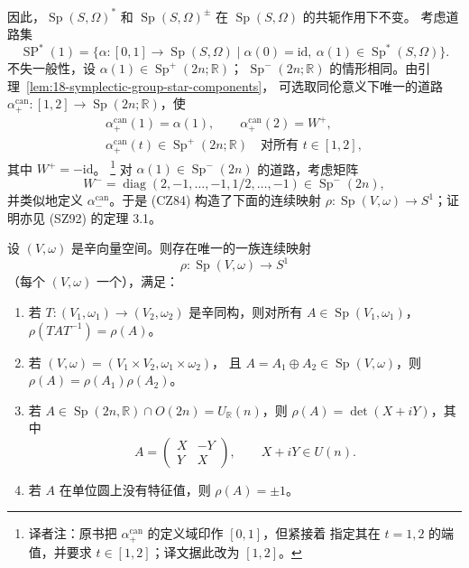 因此，$\operatorname{Sp}(S,\Omega)^*$ 和
$\operatorname{Sp}(S,\Omega)^\pm$ 在 $\operatorname{Sp}(S,\Omega)$ 的共轭作用下不变。
考虑道路集
\begin{equation}
 \operatorname{SP}^*(1)=\{\alpha:[0,1]\to\operatorname{Sp}(S,\Omega)
 \mid\alpha(0)=\mathrm{id},\ \alpha(1)\in\operatorname{Sp}^*(S,\Omega)\}.
 \label{eq:18-sp-star-path-space}
\end{equation}
不失一般性，设 $\alpha(1)\in\operatorname{Sp}^+(2n;\mathbb R)$；
$\operatorname{Sp}^-(2n;\mathbb R)$ 的情形相同。由引理~\ref{lem:18-symplectic-group-star-components}，
可选取同伦意义下唯一的道路
$\alpha_+^{\mathrm{can}}:[1,2]\to\operatorname{Sp}(2n;\mathbb R)$，使
\begin{equation}
 \begin{gathered}
  \alpha_+^{\mathrm{can}}(1)=\alpha(1),\qquad
  \alpha_+^{\mathrm{can}}(2)=W^+,\\
  \alpha_+^{\mathrm{can}}(t)\in\operatorname{Sp}^+(2n;\mathbb R)
  \quad\text{对所有 }t\in[1,2],
 \end{gathered}
 \label{eq:18-canonical-extension-path}
\end{equation}
其中 $W^+=-\mathrm{id}$。
\footnote{译者注：原书把 $\alpha_+^{\mathrm{can}}$ 的定义域印作 $[0,1]$，但紧接着
指定其在 $t=1,2$ 的端值，并要求 $t\in[1,2]$；译文据此改为 $[1,2]$。}
对 $\alpha(1)\in\operatorname{Sp}^-(2n)$ 的道路，考虑矩阵
\[
 W^-=\operatorname{diag}(2,-1,\ldots,-1,1/2,\ldots,-1)
 \in\operatorname{Sp}^-(2n),
\]
并类似地定义 $\alpha_-^{\mathrm{can}}$。于是 (CZ84) 构造了下面的连续映射
$\rho:\operatorname{Sp}(V,\omega)\to S^1$；证明亦见 (SZ92) 的定理 3.1。

\begin{theorem}
\label{thm:18-salamon-zehnder-rho-map}
设 $(V,\omega)$ 是辛向量空间。则存在唯一的一族连续映射
\[
 \rho:\operatorname{Sp}(V,\omega)\longrightarrow S^1
\]
（每个 $(V,\omega)$ 一个），满足：
\begin{enumerate}[label=(\arabic*)]
\item {} 若 $T:(V_1,\omega_1)\to(V_2,\omega_2)$ 是辛同构，则对所有
$A\in\operatorname{Sp}(V_1,\omega_1)$，
$\rho(TAT^{-1})=\rho(A)$。
\item {} 若 $(V,\omega)=(V_1\times V_2,\omega_1\times\omega_2)$，
且 $A=A_1\oplus A_2\in\operatorname{Sp}(V,\omega)$，则
$\rho(A)=\rho(A_1)\rho(A_2)$。
\item {} 若
$A\in\operatorname{Sp}(2n,\mathbb R)\cap O(2n)=U_{\mathbb R}(n)$，则
$\rho(A)=\det(X+iY)$，其中
\[
 A=\begin{pmatrix}X&-Y\\Y&X\end{pmatrix},\qquad X+iY\in U(n).
\]
\item {} 若 $A$ 在单位圆上没有特征值，则 $\rho(A)=\pm1$。
\end{enumerate}
\end{theorem}

